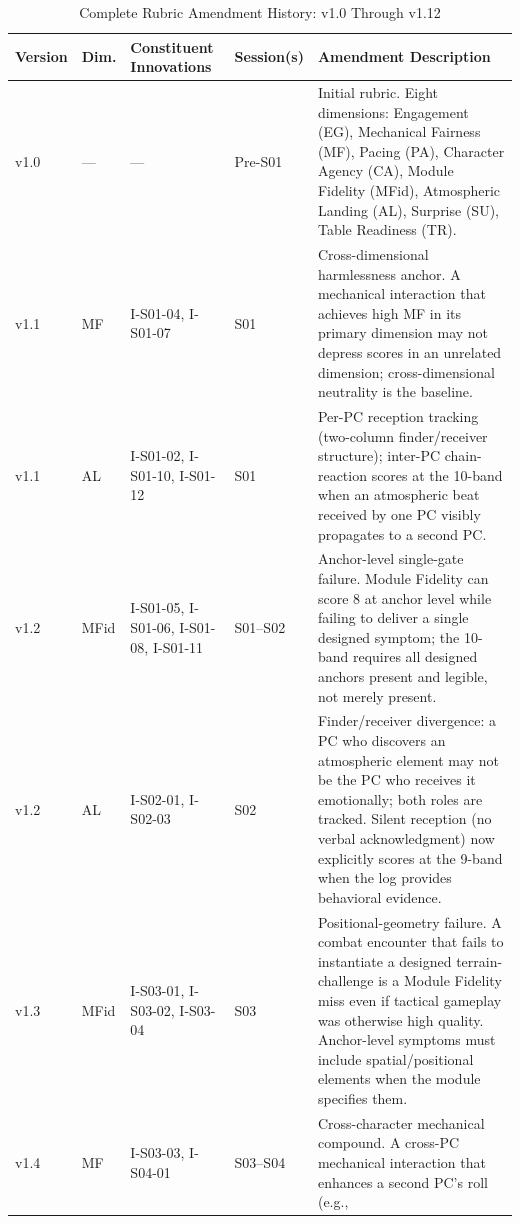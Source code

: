 \begin{table}[t]
\caption{Complete Rubric Amendment History: v1.0 Through v1.12}
\label{tab:full-history}
\setlength{\tabcolsep}{5pt}
\begin{tabular}{@{}p{0.9cm}p{1.2cm}p{3.0cm}p{3.2cm}p{5.0cm}@{}}
\toprule
Version & Dim. & Constituent Innovations & Session(s) & Amendment Description \\
\midrule
v1.0 & --- & --- & Pre-S01 & Initial rubric. Eight dimensions:
  Engagement (EG), Mechanical Fairness (MF), Pacing (PA), Character Agency (CA),
  Module Fidelity (MFid), Atmospheric Landing (AL), Surprise (SU),
  Table Readiness (TR). \\
\addlinespace[2pt]
v1.1 & MF & I-S01-04, I-S01-07 & S01 & Cross-dimensional harmlessness anchor.
  A mechanical interaction that achieves high MF in its primary dimension may
  not depress scores in an unrelated dimension; cross-dimensional neutrality is
  the baseline. \\
\addlinespace[2pt]
v1.1 & AL & I-S01-02, I-S01-10, I-S01-12 & S01 & Per-PC reception tracking
  (two-column finder/receiver structure); inter-PC chain-reaction scores at the
  10-band when an atmospheric beat received by one PC visibly propagates to a
  second PC. \\
\addlinespace[2pt]
v1.2 & MFid & I-S01-05, I-S01-06, I-S01-08, I-S01-11 & S01--S02 & Anchor-level
  single-gate failure. Module Fidelity can score 8 at anchor level while failing
  to deliver a single designed symptom; the 10-band requires all designed anchors
  present and legible, not merely present. \\
\addlinespace[2pt]
v1.2 & AL & I-S02-01, I-S02-03 & S02 & Finder/receiver divergence: a PC who
  discovers an atmospheric element may not be the PC who receives it emotionally;
  both roles are tracked. Silent reception (no verbal acknowledgment) now
  explicitly scores at the 9-band when the log provides behavioral evidence. \\
\addlinespace[2pt]
v1.3 & MFid & I-S03-01, I-S03-02, I-S03-04 & S03 & Positional-geometry failure.
  A combat encounter that fails to instantiate a designed terrain-challenge is
  a Module Fidelity miss even if tactical gameplay was otherwise high quality.
  Anchor-level symptoms must include spatial/positional elements when the module
  specifies them. \\
\addlinespace[2pt]
v1.4 & MF & I-S03-03, I-S04-01 & S03--S04 & Cross-character mechanical compound.
  A cross-PC mechanical interaction that enhances a second PC's roll (e.g.,

\end{tabular}
\end{table}
